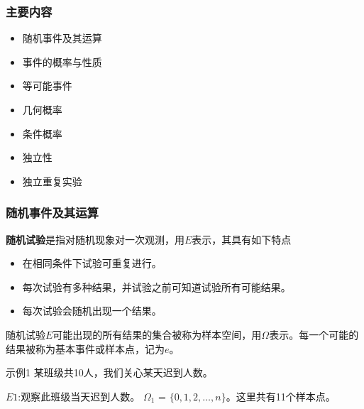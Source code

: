 \documentclass{beamer}
\begin{document}
	\begin{frame}
		\frametitle{主要内容}
		\begin{itemize}
			\item 随机事件及其运算
			\item 事件的概率与性质
			\item 等可能事件
			\item 几何概率
			\item 条件概率
			\item 独立性
			\item 独立重复实验
		\end{itemize}
	\end{frame}
	\begin{frame}
		\frametitle{随机事件及其运算}
		\textbf{随机试验}是指对随机现象对一次观测，用$E$表示，其具有如下特点
		\begin{itemize}
			\item 在相同条件下试验可重复进行。
			\item 每次试验有多种结果，并试验之前可知道试验所有可能结果。
			\item 每次试验会随机出现一个结果。
		\end{itemize}
		随机试验$E$可能出现的所有结果的集合被称为$\textbf{样本空间}$，用$\Omega$表示。每一个可能的结果被称为$\textbf{基本事件}$或$\textbf{样本点}$，记为$e$。
		
		\vspace{1cm}
		
		示例1 某班级共10人，我们关心某天迟到人数。
		
		$E1$:观察此班级当天迟到人数。
		$\Omega_1$ = $\{0, 1, 2, \dots, n\}$。这里共有11个样本点。
	\end{frame}
	
\end{document}
